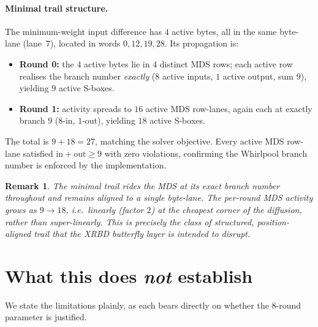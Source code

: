\documentclass[11pt,a4paper]{article}
\newcommand{\sbxes}{\textsf{S-boxes}}
\newtheorem{remark}{Remark}
\begin{document}
\paragraph{Minimal trail structure.}
The minimum-weight input difference has $4$ active bytes, all in the same
byte-lane (lane~$7$), located in words $0, 12, 19, 28$. Its propagation is:
\begin{itemize}\itemsep2pt
  \item \textbf{Round 0:} the $4$ active bytes lie in $4$ distinct MDS rows; each
        active row realises the branch number \emph{exactly} ($8$ active inputs,
        $1$ active output, sum $9$), yielding $9$ active \sbxes.
  \item \textbf{Round 1:} activity spreads to $16$ active MDS row-lanes, again
        each at exactly branch $9$ ($8$-in, $1$-out), yielding $18$ active
        \sbxes.
\end{itemize}
The total is $9 + 18 = 27$, matching the solver objective. Every active MDS
row-lane satisfied $\text{in}+\text{out}\ge 9$ with zero violations, confirming
the Whirlpool branch number is enforced by the implementation.

\begin{remark}
The minimal trail rides the MDS at its \emph{exact} branch number throughout and
remains aligned to a single byte-lane. The per-round MDS activity grows as
$9 \to 18$, i.e.\ linearly (factor $2$) at the cheapest corner of the diffusion,
rather than super-linearly. This is precisely the class of structured,
position-aligned trail that the XRBD butterfly layer is intended to disrupt.
\end{remark}

\section{What this does \emph{not} establish}
\label{sec:limits}

We state the limitations plainly, as each bears directly on whether the 8-round
parameter is justified.
\end{document}
